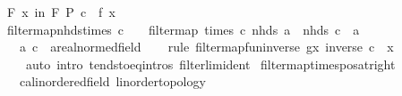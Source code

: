 \begin{isabellebody}
\ {\isachardoublequoteopen}{\isasymforall}\isactrlsub F\ x\ in\ F{}{\isachardot}{\kern0pt}\ P\ {\isacharparenleft}{\kern0pt}c\ {\isacharasterisk}{\kern0pt}\ f\ x{\isacharparenright}{\kern0pt}{\isachardoublequoteclose}\ \isacommand{{\isachardot}{\kern0pt}}\isamarkupfalse%
\isanewline
{}\isamarkupfalse%
%
\endisatagproof
{\isafoldproof}%
%
\isadelimproof
\isanewline
%
\endisadelimproof
\isanewline
{}\isamarkupfalse%
\ filtermap{\isacharunderscore}{\kern0pt}nhds{\isacharunderscore}{\kern0pt}times{\isacharcolon}{\kern0pt}\ {\isachardoublequoteopen}c\ {\isasymnoteq}\ {}\ {\isasymLongrightarrow}\ filtermap\ {\isacharparenleft}{\kern0pt}times\ c{\isacharparenright}{\kern0pt}\ {\isacharparenleft}{\kern0pt}nhds\ a{\isacharparenright}{\kern0pt}\ {\isacharequal}{\kern0pt}\ nhds\ {\isacharparenleft}{\kern0pt}c\ {\isacharasterisk}{\kern0pt}\ a{\isacharparenright}{\kern0pt}{\isachardoublequoteclose}\isanewline
\ \ \ a\ c\ {\isacharcolon}{\kern0pt}{\isacharcolon}{\kern0pt}\ {\isachardoublequoteopen}{\isacharprime}{\kern0pt}a{\isacharcolon}{\kern0pt}{\isacharcolon}{\kern0pt}real{\isacharunderscore}{\kern0pt}normed{\isacharunderscore}{\kern0pt}field{\isachardoublequoteclose}\isanewline
%
\isadelimproof
\ \ %
\endisadelimproof
%
\isatagproof
{}\isamarkupfalse%
\ {\isacharparenleft}{\kern0pt}rule\ filtermap{\isacharunderscore}{\kern0pt}fun{\isacharunderscore}{\kern0pt}inverse{\isacharbrackleft}{\kern0pt}\ g{\isacharequal}{\kern0pt}{\isachardoublequoteopen}{\isasymlambda}x{\isachardot}{\kern0pt}\ inverse\ c\ {\isacharasterisk}{\kern0pt}\ x{\isachardoublequoteclose}{\isacharbrackright}{\kern0pt}{\isacharparenright}{\kern0pt}\isanewline
\ \ \ \ {\isacharparenleft}{\kern0pt}auto\ intro{\isacharbang}{\kern0pt}{\isacharcolon}{\kern0pt}\ tendsto{\isacharunderscore}{\kern0pt}eq{\isacharunderscore}{\kern0pt}intros\ filterlim{\isacharunderscore}{\kern0pt}ident{\isacharparenright}{\kern0pt}%
\endisatagproof
{\isafoldproof}%
%
\isadelimproof
\isanewline
%
\endisadelimproof
\isanewline
{}\isamarkupfalse%
\ filtermap{\isacharunderscore}{\kern0pt}times{\isacharunderscore}{\kern0pt}pos{\isacharunderscore}{\kern0pt}at{\isacharunderscore}{\kern0pt}right{\isacharcolon}{\kern0pt}\isanewline
\ \ \ c{\isacharcolon}{\kern0pt}{\isacharcolon}{\kern0pt}{\isachardoublequoteopen}{\isacharprime}{\kern0pt}a{\isacharcolon}{\kern0pt}{\isacharcolon}{\kern0pt}{\isacharbraceleft}{\kern0pt}linordered{\isacharunderscore}{\kern0pt}field{\isacharcomma}{\kern0pt}\ linorder{\isacharunderscore}{\kern0pt}topology{\isacharbraceright}{\kern0pt}{\isachardoublequoteclose}\isanewline

\end{isabellebody}

